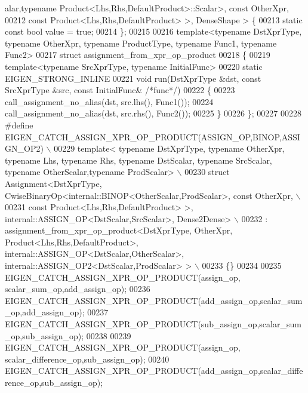 \begin{DoxyCode}
      alar,typename Product<Lhs,Rhs,DefaultProduct>::Scalar>, const OtherXpr,
00212                                                const Product<Lhs,Rhs,DefaultProduct> >, DenseShape > \{
00213   \textcolor{keyword}{static} \textcolor{keyword}{const} \textcolor{keywordtype}{bool} value = \textcolor{keyword}{true};
00214 \};
00215 
00216 \textcolor{keyword}{template}<\textcolor{keyword}{typename} DstXprType, \textcolor{keyword}{typename} OtherXpr, \textcolor{keyword}{typename} ProductType, \textcolor{keyword}{typename} Func1, \textcolor{keyword}{typename} Func2>
00217 \textcolor{keyword}{struct }assignment\_from\_xpr\_op\_product
00218 \{
00219   \textcolor{keyword}{template}<\textcolor{keyword}{typename} SrcXprType, \textcolor{keyword}{typename} InitialFunc>
00220   \textcolor{keyword}{static} EIGEN\_STRONG\_INLINE
00221   \textcolor{keywordtype}{void} run(DstXprType &dst, \textcolor{keyword}{const} SrcXprType &src, \textcolor{keyword}{const} InitialFunc& \textcolor{comment}{/*func*/})
00222   \{
00223     call\_assignment\_no\_alias(dst, src.lhs(), Func1());
00224     call\_assignment\_no\_alias(dst, src.rhs(), Func2());
00225   \}
00226 \};
00227 
00228 \textcolor{preprocessor}{#define EIGEN\_CATCH\_ASSIGN\_XPR\_OP\_PRODUCT(ASSIGN\_OP,BINOP,ASSIGN\_OP2) \(\backslash\)}
00229 \textcolor{preprocessor}{  template< typename DstXprType, typename OtherXpr, typename Lhs, typename Rhs, typename DstScalar,
       typename SrcScalar, typename OtherScalar,typename ProdScalar> \(\backslash\)}
00230 \textcolor{preprocessor}{  struct Assignment<DstXprType, CwiseBinaryOp<internal::BINOP<OtherScalar,ProdScalar>, const OtherXpr, \(\backslash\)}
00231 \textcolor{preprocessor}{                                            const Product<Lhs,Rhs,DefaultProduct> >,
       internal::ASSIGN\_OP<DstScalar,SrcScalar>, Dense2Dense> \(\backslash\)}
00232 \textcolor{preprocessor}{    : assignment\_from\_xpr\_op\_product<DstXprType, OtherXpr, Product<Lhs,Rhs,DefaultProduct>,
       internal::ASSIGN\_OP<DstScalar,OtherScalar>, internal::ASSIGN\_OP2<DstScalar,ProdScalar> > \(\backslash\)}
00233 \textcolor{preprocessor}{  \{\}}
00234 
00235 EIGEN\_CATCH\_ASSIGN\_XPR\_OP\_PRODUCT(assign\_op,    scalar\_sum\_op,add\_assign\_op);
00236 EIGEN\_CATCH\_ASSIGN\_XPR\_OP\_PRODUCT(add\_assign\_op,scalar\_sum\_op,add\_assign\_op);
00237 EIGEN\_CATCH\_ASSIGN\_XPR\_OP\_PRODUCT(sub\_assign\_op,scalar\_sum\_op,sub\_assign\_op);
00238 
00239 EIGEN\_CATCH\_ASSIGN\_XPR\_OP\_PRODUCT(assign\_op,    scalar\_difference\_op,sub\_assign\_op);
00240 EIGEN\_CATCH\_ASSIGN\_XPR\_OP\_PRODUCT(add\_assign\_op,scalar\_difference\_op,sub\_assign\_op);

\end{DoxyCode}
